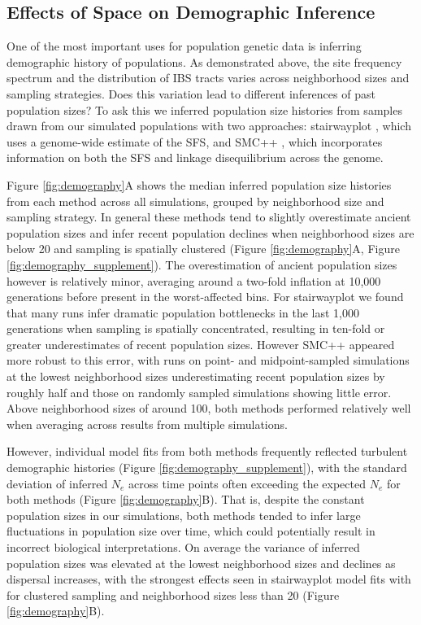 \documentclass[10pt,twoside,lineno,hidelinks]{preprint}
\begin{document}
\subsection{Effects of Space on Demographic Inference}

One of the most important uses for population genetic data is inferring demographic history of populations. As demonstrated above, the site frequency spectrum and the distribution of IBS tracts varies across neighborhood sizes and sampling strategies. Does this variation lead to different inferences of past population sizes? To ask this we inferred population size histories from samples drawn from our simulated populations with two approaches: stairwayplot \citep{Liu2015}, which uses a genome-wide estimate of the SFS, and SMC++ \citep{Terhorst2016}, which incorporates information on both the SFS and linkage disequilibrium across the genome.

Figure \ref{fig:demography}A shows the median inferred population size histories from each method across all simulations, grouped by neighborhood size and sampling strategy. In general these methods tend to slightly overestimate ancient population sizes and infer recent population declines when neighborhood sizes are below 20 and sampling is spatially clustered (Figure \ref{fig:demography}A, Figure \ref{fig:demography_supplement}). The overestimation of ancient population sizes however is relatively minor, averaging around a two-fold inflation at 10,000 generations before present in the worst-affected bins. For stairwayplot we found that many runs infer dramatic population bottlenecks in the last 1,000 generations when sampling is spatially concentrated, resulting in ten-fold or greater underestimates of recent population sizes. However SMC++ appeared more robust to this error, with runs on point- and midpoint-sampled simulations at the lowest neighborhood sizes underestimating recent population sizes by roughly half and those on randomly sampled simulations showing little error. Above neighborhood sizes of around 100, both methods performed relatively well when averaging across results from multiple simulations. 

However, individual model fits from both methods frequently reflected turbulent demographic histories (Figure \ref{fig:demography_supplement}), with the standard deviation of inferred $N_{e}$ across time points often exceeding the expected $N_{e}$ for both methods (Figure \ref{fig:demography}B). That is, despite the constant population sizes in our simulations, both methods tended to infer large fluctuations in population size over time, which could potentially result in incorrect biological interpretations. On average the variance of inferred population sizes was elevated at the lowest neighborhood sizes and declines as dispersal increases, with the strongest effects seen in stairwayplot model fits with for clustered sampling and neighborhood sizes less than 20 (Figure \ref{fig:demography}B). 
\end{document}
